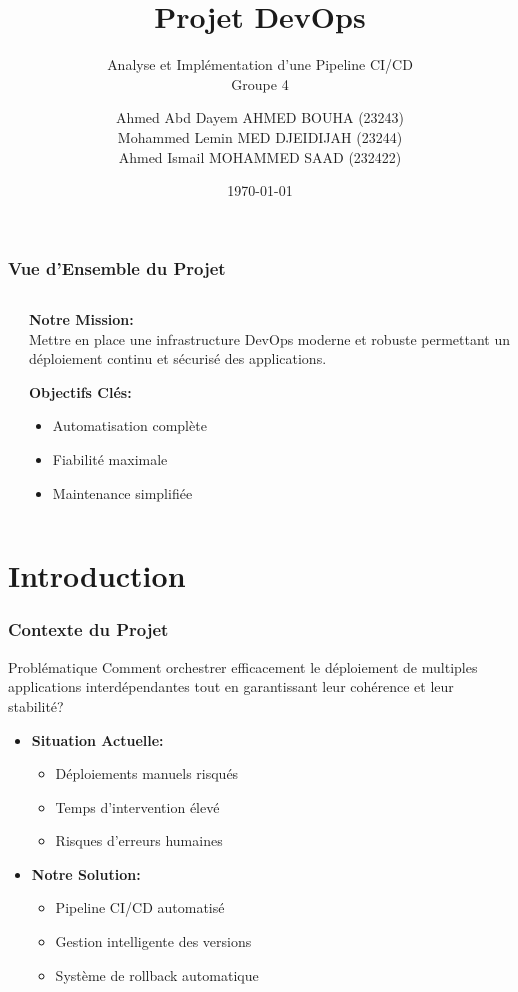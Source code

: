 \documentclass[aspectratio=169]{beamer}
\title{\textbf{Projet DevOps}}
\subtitle{Analyse et Implémentation d'une Pipeline CI/CD\\{\small Groupe 4}}
\author{
    Ahmed Abd Dayem AHMED BOUHA (23243) \\
    Mohammed Lemin MED DJEIDIJAH  (23244) \\
    Ahmed Ismail MOHAMMED SAAD (232422)
}
\date{\today}
\begin{document}
\begin{frame}
    \titlepage
\end{frame}

\begin{frame}
    \frametitle{Vue d'Ensemble du Projet}
    \begin{columns}[t]
        \begin{column}{0.4\textwidth}
            \tableofcontents[hideallsubsections]
        \end{column}
        \begin{column}{0.6\textwidth}
            \textbf{Notre Mission:}\\
            Mettre en place une infrastructure DevOps moderne et robuste permettant un déploiement continu et sécurisé des applications.
            
            \vspace{0.5cm}
            \textbf{Objectifs Clés:}
            \begin{itemize}
                \item Automatisation complète
                \item Fiabilité maximale
                \item Maintenance simplifiée
            \end{itemize}
        \end{column}
    \end{columns}
\end{frame}

\section{Introduction}
\begin{frame}
    \frametitle{Contexte du Projet}
    \begin{block}{Problématique}
        Comment orchestrer efficacement le déploiement de multiples applications interdépendantes tout en garantissant leur cohérence et leur stabilité?
    \end{block}
    \pause
    \begin{itemize}
        \item \textbf{Situation Actuelle:}
        \begin{itemize}
            \item Déploiements manuels risqués
            \item Temps d'intervention élevé
            \item Risques d'erreurs humaines
        \end{itemize}
        \pause
        \item \textbf{Notre Solution:}
        \begin{itemize}
            \item Pipeline CI/CD automatisé
            \item Gestion intelligente des versions
            \item Système de rollback automatique
        \end{itemize}
    \end{itemize}
\end{frame}
\end{document}

